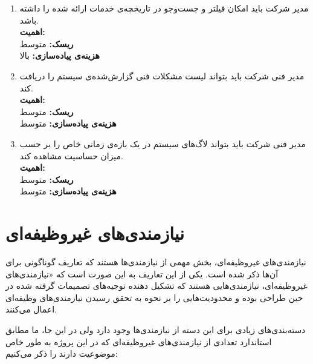 \begin{enumerate}
\item
مدیر شرکت باید امکان فیلتر و جست‌وجو در تاریخچه‌ی خدمات ارائه شده را داشته باشد.
\\
\textbf{اهمیت:} 
\\
\textbf{ریسک:} متوسط
\\
\textbf{هزینه‌ی پیاده‌سازی:} بالا

\item
مدیر فنی شرکت باید بتواند لیست مشکلات فنی گزارش‌شده‌ی سیستم را دریافت کند.
\\
\textbf{اهمیت:} 
\\
\textbf{ریسک:} متوسط
\\
\textbf{هزینه‌ی پیاده‌سازی:} متوسط



\item
مدیر فنی شرکت باید بتواند لاگ‌های سیستم در یک بازه‌ی زمانی خاص را بر حسب میزان حساسیت مشاهده کند.
\\
\textbf{اهمیت:} 
\\
\textbf{ریسک:} متوسط
\\
\textbf{هزینه‌ی پیاده‌سازی:} متوسط

\end{enumerate}

\section{نیاز‌مندی‌های غیروظیفه‌ای}

نیازمندی‌های غیروظیفه‌ای، بخش مهمی از نیازمندی‌ها هستند که تعاریف گوناگونی برای آن‌ها ذکر شده است. یکی از این تعاریف به این صورت است که «نیازمندی‌های غیروظیفه‌ای، نیازمندی‌هایی هستند که تشکیل دهنده توجیه‌های تصمیمات گرفته شده در حین طراحی بوده و محدودیت‌هایی را بر نحوه به تحقق رسیدن نیازمندی‌های وظیفه‌ای اعمال می‌کنند.

دسته‌بندی‌های زیادی برای این دسته از نیازمندی‌ها وجود دارد ولی در این جا، ما مطابق استاندارد  تعدادی از نیازمندی‌های غیروظیفه‌ای که در این پروژه به طور خاص موضوعیت دارند را ذکر می‌کنیم:

